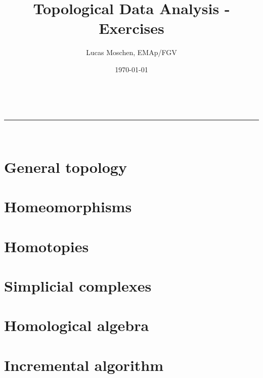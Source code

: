 \documentclass[a4paper,11pt]{article}
\title{Topological Data Analysis - Exercises}
\author{Lucas Moschen, EMAp/FGV}
\date{\today}
\makeatletter
\newcommand{\linia}{\rule{\linewidth}{0.5pt}}
\theoremstyle{mytheor}
\theoremstyle{mytheor}
\theoremstyle{remark}
\renewcommand{\maketitle}{
    \begin{center}
        \vspace{2ex}
        {\huge \textsc{\@title}}
        \vspace{1ex}
        \\
        \linia\\
        \@author \hfill \@date
        \vspace{4ex}
    \end{center}
}
\makeatother
\begin{document}
\maketitle

\tableofcontents

\section{General topology}



\newpage

\section{Homeomorphisms}



\newpage

\section{Homotopies}



\newpage

\section{Simplicial complexes}



\newpage

\section{Homological algebra}



\newpage

\section{Incremental algorithm}



\newpage
\end{document}
